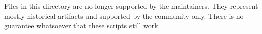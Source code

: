 Files in this directory are no longer supported by the maintainers. They represent mostly historical artifacts and supported by the community only. There is no guarantee whatsoever that these scripts still work. 
